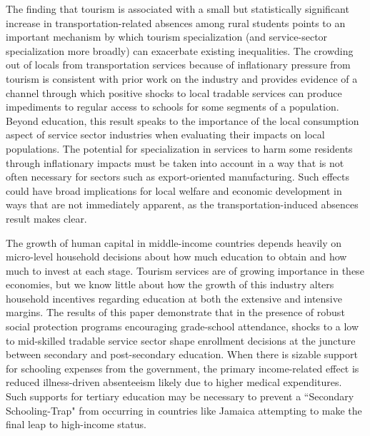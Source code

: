 \documentclass[12pt]{article}
\begin{document}
		The finding that tourism is associated with a small but statistically significant increase in transportation-related absences among rural students points to an important mechanism by which tourism specialization (and service-sector specialization more broadly) can exacerbate existing inequalities. The crowding out of locals from transportation services because of inflationary pressure from tourism is consistent with prior work on the industry and provides evidence of a channel through which positive shocks to local tradable services can produce impediments to regular access to schools for some segments of a population. Beyond education, this result speaks to the importance of the local consumption aspect of service sector industries when evaluating their impacts on local populations. The potential for specialization in services to harm some residents through inflationary impacts must be taken into account in a way that is not often necessary for sectors such as export-oriented manufacturing. Such effects could have broad implications for local welfare and economic development in ways that are not immediately apparent, as the transportation-induced absences result makes clear.
		
		
			The growth of human capital in middle-income countries depends heavily on micro-level household decisions about how much education to obtain and how much to invest at each stage. Tourism services are of growing importance in these economies, but we know little about how the growth of this industry alters household incentives regarding education at both the extensive and intensive margins. The results of this paper demonstrate that in the presence of robust social protection programs encouraging grade-school attendance, shocks to a low to mid-skilled tradable service sector shape enrollment decisions at the juncture between secondary and post-secondary education. When there is sizable support for schooling expenses from the government, the primary income-related effect is reduced illness-driven absenteeism likely due to higher medical expenditures. Such supports for tertiary education may be necessary to prevent a ``Secondary Schooling-Trap" from occurring in countries like Jamaica attempting to make the final leap to high-income status.
			
\end{document}
